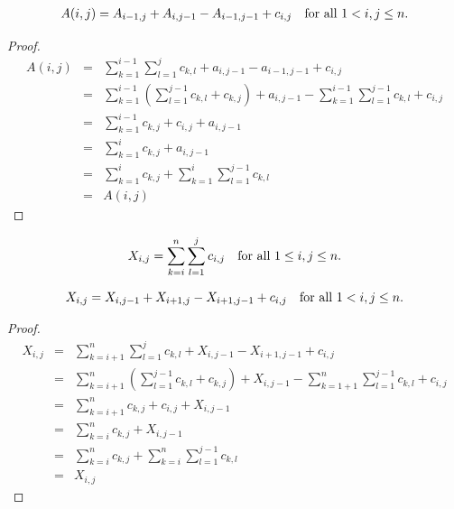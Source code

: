 \documentclass[AMA,LATO1COL]{WileyNJD-v2-bak}
\begin{document}
\begin{lemma}
\begin{eqnarray}
A(i,j)=A_{i-1,j}+A_{i,j-1}-A_{i-1,j-1}+c_{i,j} \mbox{\quad for all $1<i,j\leq n$}.
\end{eqnarray}
\end{lemma}

\begin{proof}
\begin{eqnarray}
A(i,j)& = & \sum_{k=1}^{i-1}\sum_{l=1}^{j}c_{k,l}+a_{i,j-1}-a_{i-1,j-1}+c_{i,j}\\
 & = & \sum_{k=1}^{i-1}\left(\sum_{l=1}^{j-1}c_{k,l}+c_{k,j}\right)+a_{i,j-1}-\sum_{k=1}^{i-1}\sum_{l=1}^{j-1}c_{k,l}+c_{i,j}\\
 & = & \sum_{k=1}^{i-1}c_{k,j}+c_{i,j}+a_{i,j-1}\\
 & = & \sum_{k=1}^{i}c_{k,j}+a_{i,j-1}\\
 & = & \sum_{k=1}^{i}c_{k,j}+\sum_{k=1}^{i}\sum_{l=1}^{j-1}c_{k,l}\\
 & = & A(i,j)
\end{eqnarray}

\end{proof}

\begin{definition}
\begin{equation}
X_{i,j}=\sum_{k=i}^{n}\sum_{l=1}^{j}c_{i,j}\mbox{\quad for all $1\leq i,j\leq n$}.
\end{equation}
\end{definition}

\begin{lemma}
\begin{equation}
X_{i,j}=X_{i,j-1}+X_{i+1,j}-X_{i+1,j-1}+c_{i,j} \mbox{\quad for all $1<i,j\leq n$}.
\end{equation}
\end{lemma}

\begin{proof}
\begin{eqnarray*}
X_{i,j}& = & \sum_{k=i+1}^{n}\sum_{l=1}^{j}c_{k,l}+X_{i,j-1}-X_{i+1,j-1}+c_{i,j}\\
 & = & \sum_{k=i+1}^{n}\left(\sum_{l=1}^{j-1}c_{k,l}+c_{k,j}\right)+X_{i,j-1}-\sum_{k=1+1}^{n}\sum_{l=1}^{j-1}c_{k,l}+c_{i,j}\\
 & = & \sum_{k=i+1}^{n}c_{k,j}+c_{i,j}+X_{i,j-1}\\
 & = & \sum_{k=i}^{n}c_{k,j}+X_{i,j-1}\\
 & = & \sum_{k=i}^{n}c_{k,j}+\sum_{k=i}^{n}\sum_{l=1}^{j-1}c_{k,l}\\
 & = & X_{i,j}
\end{eqnarray*}
\end{proof}
\end{document}
